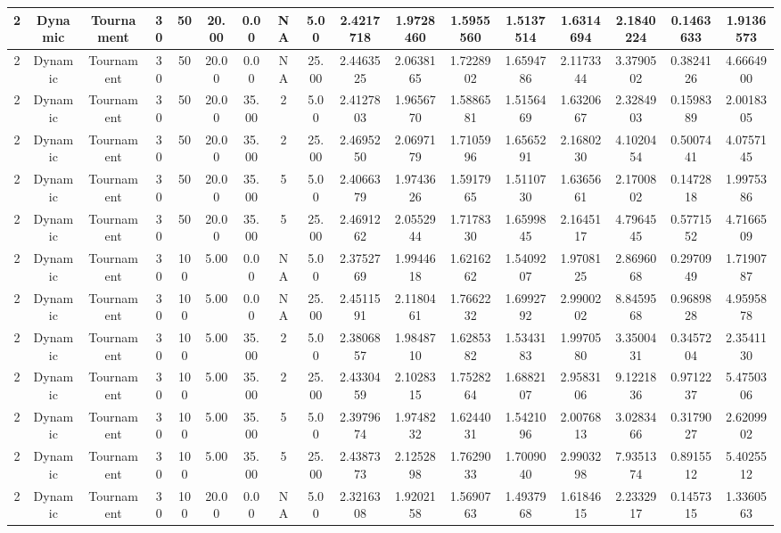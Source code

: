 \documentclass[a4paper]{article}
\begin{document}
\begin{center}
\begin{tabular}{ | c | c | c | c | c | c | c | c | c | c | c | c | c | c | c | c | c | }
		\hline
		2	&	Dynamic	&	Tournament	&	30	&	50	&	20.00	&	0.00	&	NA	&	5.00	&	2.4217718	&	1.9728460	&	1.5955560	&	1.5137514	&	1.6314694	&	2.1840224	&	0.1463633	&	1.9136573 \\
		\hline
		2	&	Dynamic	&	Tournament	&	30	&	50	&	20.00	&	0.00	&	NA	&	25.00	&	2.4463525	&	2.0638165	&	1.7228902	&	1.6594786	&	2.1173344	&	3.3790502	&	0.3824126	&	4.6664900 \\
		\hline
		2	&	Dynamic	&	Tournament	&	30	&	50	&	20.00	&	35.00	&	2	&	5.00	&	2.4127803	&	1.9656770	&	1.5886581	&	1.5156469	&	1.6320667	&	2.3284903	&	0.1598389	&	2.0018305 \\
		\hline
		2	&	Dynamic	&	Tournament	&	30	&	50	&	20.00	&	35.00	&	2	&	25.00	&	2.4695250	&	2.0697179	&	1.7105996	&	1.6565291	&	2.1680230	&	4.1020454	&	0.5007441	&	4.0757145 \\
		\hline
		2	&	Dynamic	&	Tournament	&	30	&	50	&	20.00	&	35.00	&	5	&	5.00	&	2.4066379	&	1.9743626	&	1.5917965	&	1.5110730	&	1.6365661	&	2.1700802	&	0.1472818	&	1.9975386 \\
		\hline
		2	&	Dynamic	&	Tournament	&	30	&	50	&	20.00	&	35.00	&	5	&	25.00	&	2.4691262	&	2.0552944	&	1.7178330	&	1.6599845	&	2.1645117	&	4.7964545	&	0.5771552	&	4.7166509 \\
		\hline
		2	&	Dynamic	&	Tournament	&	30	&	100	&	5.00	&	0.00	&	NA	&	5.00	&	2.3752769	&	1.9944618	&	1.6216262	&	1.5409207	&	1.9708125	&	2.8696068	&	0.2970949	&	1.7190787 \\
		\hline
		2	&	Dynamic	&	Tournament	&	30	&	100	&	5.00	&	0.00	&	NA	&	25.00	&	2.4511591	&	2.1180461	&	1.7662232	&	1.6992792	&	2.9900202	&	8.8459568	&	0.9689828	&	4.9595878 \\
		\hline
		2	&	Dynamic	&	Tournament	&	30	&	100	&	5.00	&	35.00	&	2	&	5.00	&	2.3806857	&	1.9848710	&	1.6285382	&	1.5343183	&	1.9970580	&	3.3500431	&	0.3457204	&	2.3541130 \\
		\hline
		2	&	Dynamic	&	Tournament	&	30	&	100	&	5.00	&	35.00	&	2	&	25.00	&	2.4330459	&	2.1028315	&	1.7528264	&	1.6882107	&	2.9583106	&	9.1221836	&	0.9712237	&	5.4750306 \\
		\hline
		2	&	Dynamic	&	Tournament	&	30	&	100	&	5.00	&	35.00	&	5	&	5.00	&	2.3979674	&	1.9748232	&	1.6244031	&	1.5421096	&	2.0076813	&	3.0283466	&	0.3179027	&	2.6209902 \\
		\hline
		2	&	Dynamic	&	Tournament	&	30	&	100	&	5.00	&	35.00	&	5	&	25.00	&	2.4387373	&	2.1252898	&	1.7629033	&	1.7009040	&	2.9903298	&	7.9351374	&	0.8915512	&	5.4025512 \\
		\hline
		2	&	Dynamic	&	Tournament	&	30	&	100	&	20.00	&	0.00	&	NA	&	5.00	&	2.3216308	&	1.9202158	&	1.5690763	&	1.4937968	&	1.6184615	&	2.2332917	&	0.1457315	&	1.3360563 \\

\end{tabular}
\end{center}
\end{document}
